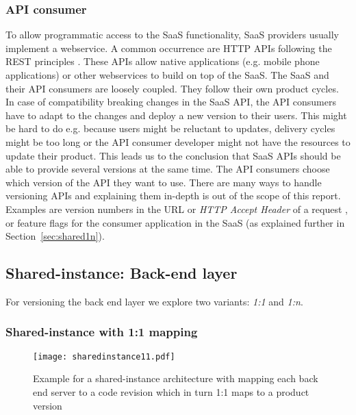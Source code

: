 \subsubsection{API consumer} To allow programmatic access to the SaaS functionality, SaaS providers usually implement a webservice. A common occurrence are HTTP APIs following the REST principles \cite{Fielding2000}. These APIs allow native applications (e.g. mobile phone applications) or other webservices to build on top of the SaaS. The SaaS and their API consumers are loosely coupled. They follow their own product cycles. In case of compatibility breaking changes in the SaaS API, the API consumers have to adapt to the changes and deploy a new version to their users. This might be hard to do e.g. because users might be reluctant to updates, delivery cycles might be too long or the API consumer developer might not have the resources to update their product. This leads us to the conclusion that SaaS APIs should be able to provide several versions at the same time. The API consumers choose which version of the API they want to use. There are many ways to handle versioning APIs and explaining them in-depth is out of the scope of this report. Examples are version numbers in the URL or \emph{HTTP Accept Header} of a request \cite{RFC2616}, or feature flags for the consumer application in the SaaS \cite{playbook2013} (as explained further in Section~\ref{sec:shared1n}).


\subsection{Shared-instance: Back-end layer}
\label{sec:backend}

For versioning the back end layer we explore two variants: \emph{1:1} and \emph{1:n}.

\subsubsection{Shared-instance with 1:1 mapping}

\begin{figure}[h!]
\centering
\texttt{[image: sharedinstance11.pdf]}
\caption{Example for a shared-instance architecture with mapping each back end server to a code revision which in turn 1:1 maps to a product version}
\label{fig:sharedinstance11}
\end{figure}

